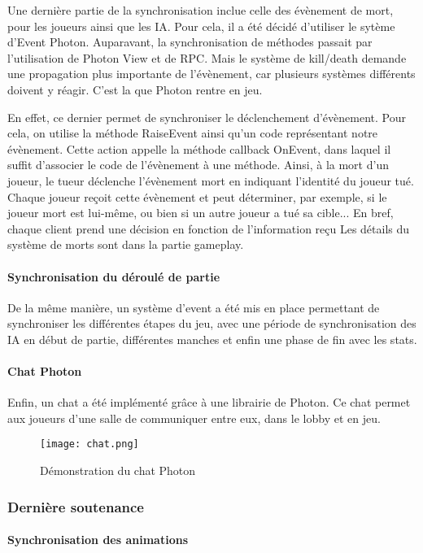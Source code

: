             Une dernière partie de la synchronisation inclue celle des évènement de mort, pour les joueurs ainsi
            que les IA. Pour cela, il a été décidé d'utiliser le sytème d'Event Photon. Auparavant, la synchronisation de méthodes
            passait par l'utilisation de Photon View et de RPC. Mais le système de kill/death demande une propagation plus importante
            de l'évènement, car plusieurs systèmes différents doivent y réagir. C'est la que Photon rentre en jeu.

            En effet, ce dernier permet de synchroniser le déclenchement d'évènement. Pour cela, on utilise la méthode RaiseEvent ainsi
            qu'un code représentant notre évènement. Cette action appelle la méthode callback OnEvent, dans laquel il suffit d'associer le
            code de l'évènement à une méthode. Ainsi, à la mort d'un joueur, le tueur déclenche l'évènement mort en indiquant l'identité du
            joueur tué. Chaque joueur reçoit cette évènement et peut déterminer, par exemple, si le joueur mort est lui-même, ou bien si un
            autre joueur a tué sa cible... En bref, chaque client prend une décision en fonction de l'information reçu
            Les détails du système de morts sont dans la partie gameplay.


        \paragraph{Synchronisation du déroulé de partie}

            De la même manière, un système d'event a été mis en place permettant de synchroniser les différentes étapes du jeu, 
            avec une période de synchronisation des IA en début de partie, différentes manches et enfin une phase de fin avec les stats.


        \paragraph{Chat Photon}

        Enfin, un chat a été implémenté grâce à une librairie de Photon. Ce chat permet aux joueurs 
        d'une salle de communiquer entre eux, dans le lobby et en jeu.

        \begin{figure}[hbt!]
            \centering
            \texttt{[image: chat.png]}
            \caption{Démonstration du chat Photon}
        \end{figure}


    \subsubsection{Dernière soutenance}

        \paragraph{Synchronisation des animations}

